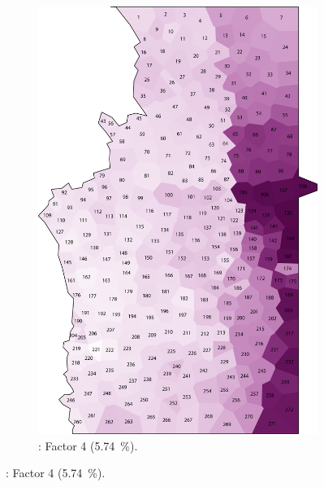 \documentclass[output=paper]{LSP/langsci}
\begin{document}
\begin{figure}
\begin{subfigure}[t]{0.3\textwidth}
\includegraphics[width=\textwidth]{illustrations/pickl_fig5}
\caption{: Factor 4 (5.74~\%).}
\label{fig:5}
\end{subfigure}

\vskip11pt


\end{figure}
\end{document}
